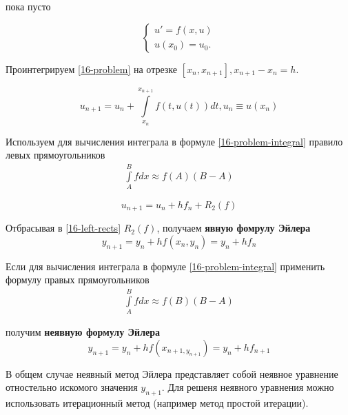 \begin{col-answer-preambule}
	\begin{plan}
    \item пока пусто
	\end{plan}
\end{col-answer-preambule}


\begin{equation}
  \label{16-problem}
  \begin{cases}
    u' = f(x, u)\\
    u(x_0) = u_0.
  \end{cases}
\end{equation}

Проинтегрируем \eqref{16-problem} на отрезке $[x_n, x_{n + 1}], x_{n + 1} - x_n = h$.

\begin{equation}
  \label{16-problem-integral}
  u_{n + 1} = u_n + \int\limits_{x_n}^{x_{n + 1}}f(t, u(t))dt, u_n \equiv u(x_n)
\end{equation}

Используем для вычисления интеграла в формуле \eqref{16-problem-integral}
правило левых прямоугольников
\begin{align*}
  \int\limits_A^Bfdx \approx f(A)(B - A)
\end{align*}

\begin{equation}
  \label{16-left-rects}
  u_{n + 1} = u_n + hf_n + R_2(f)
\end{equation}

Отбрасывая в \eqref{16-left-rects} $R_2(f)$, получаем
\textbf{явную фомрулу Эйлера}
\begin{equation}
  y_{n + 1} = y_n + hf(x_n, y_n) = y_n + hf_n
\end{equation}

Если для вычисления интеграла в формуле \eqref{16-problem-integral} применить
формулу правых прямоугольников
\begin{align*}
  \int\limits_A^Bfdx \approx f(B)(B - A)
\end{align*}

получим \textbf{неявную формулу Эйлера}
\begin{equation}
  y_{n + 1} = y_n + hf(x_{n + 1, y_{n + 1}}) = y_n + hf_{n + 1}
\end{equation}

В общем случае неявный метод Эйлера представляет собой неявное уравнение
отностельно искомого значения $y_{n + 1}$. Для решеня неявного уравнения можно
использовать итерационный метод (например метод простой итерации).

